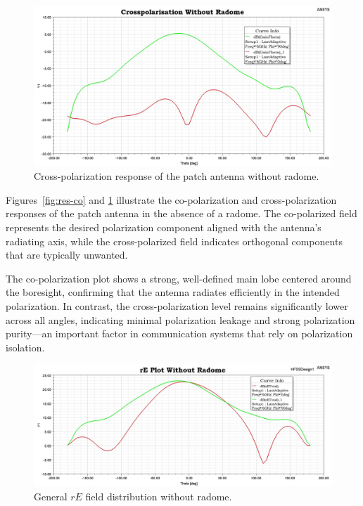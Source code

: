 \begin{figure}[H]
    \centering
    \includegraphics[width=1.0\textwidth]{figures/without_radome/cross.jpeg}
    \caption{Cross-polarization response of the patch antenna without radome.}
    \label{fig:res-cross}
\end{figure}

Figures~\ref{fig:res-co} and \ref{fig:res-cross} illustrate the co-polarization and cross-polarization responses of the patch antenna in the absence of a radome. The co-polarized field represents the desired polarization component aligned with the antenna's radiating axis, while the cross-polarized field indicates orthogonal components that are typically unwanted.

The co-polarization plot shows a strong, well-defined main lobe centered around the boresight, confirming that the antenna radiates efficiently in the intended polarization. In contrast, the cross-polarization level remains significantly lower across all angles, indicating minimal polarization leakage and strong polarization purity—an important factor in communication systems that rely on polarization isolation.

\begin{figure}[H]
    \centering
    \includegraphics[width=1.0\textwidth]{figures/without_radome/rE.jpeg}
    \caption{General $rE$ field distribution without radome.}
    \label{fig:res-flat-re-overview}
\end{figure}

